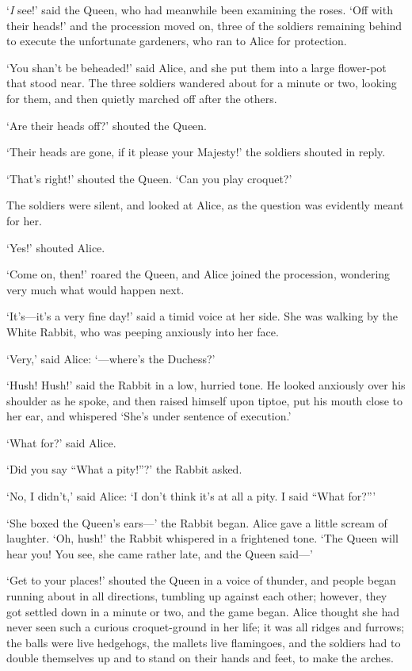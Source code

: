 \documentclass[12pt,openany]{memoir}
\begin{document}
`\textit{I} see!' said the Queen, who had meanwhile been examining the roses. `Off with their heads!' and the procession moved on, three of the soldiers remaining behind to execute the unfortunate gardeners, who ran to Alice for protection.

`You shan't be beheaded!' said Alice, and she put them into a large flower-pot that stood near. The three soldiers wandered about for a minute or two, looking for them, and then quietly marched off after the others.

`Are their heads off?' shouted the Queen.

`Their heads are gone, if it please your Majesty!' the soldiers shouted in reply.

`That's right!' shouted the Queen. `Can you play croquet?'

The soldiers were silent, and looked at Alice, as the question was evidently meant for her.

`Yes!' shouted Alice.

`Come on, then!' roared the Queen, and Alice joined the procession, wondering very much what would happen next.

`It's---it's a very fine day!' said a timid voice at her side. She was walking by the White Rabbit, who was peeping anxiously into her face.

`Very,' said Alice: `---where's the Duchess?'

`Hush! Hush!' said the Rabbit in a low, hurried tone. He looked anxiously over his shoulder as he spoke, and then raised himself upon tiptoe, put his mouth close to her ear, and whispered `She's under sentence of execution.'

`What for?' said Alice.

`Did you say ``What a pity!''?' the Rabbit asked.

`No, I didn't,' said Alice: `I don't think it's at all a pity. I said ``What for?'''

`She boxed the Queen's ears---' the Rabbit began. Alice gave a little scream of laughter. `Oh, hush!' the Rabbit whispered in a frightened tone. `The Queen will hear you! You see, she came rather late, and the Queen said---'

`Get to your places!' shouted the Queen in a voice of thunder, and people began running about in all directions, tumbling up against each other; however, they got settled down in a minute or two, and the game began. Alice thought she had never seen such a curious croquet-ground in her life; it was all ridges and furrows; the balls were live hedgehogs, the mallets live flamingoes, and the soldiers had to double themselves up and to stand on their hands and feet, to make the arches.
\end{document}
